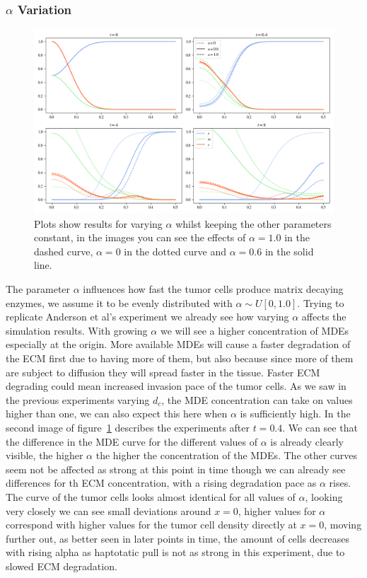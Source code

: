 \subsubsection*{$\alpha$ Variation}
\begin{figure}[h]
    \centering
    \includegraphics[width=\textwidth]{resources/images/alpha_variation.png}
    \caption{Plots show results for varying $\alpha$ whilst keeping the other parameters constant, in the images you can see the effects of $\alpha=1.0$ in the dashed curve, $\alpha=0$ in the dotted curve and $\alpha=0.6$ in the solid line.}
    \label{fig:alpha_variation}
\end{figure}
The parameter $\alpha$ influences how fast the tumor cells produce matrix decaying enzymes, we assume it to be evenly distributed with $\alpha \sim U[0, 1.0]$. Trying to replicate Anderson et al's experiment we already see how varying $\alpha$ affects the simulation results. With growing $\alpha$ we will see a higher concentration of MDEs especially at the origin. More available MDEs will cause a faster degradation of the ECM first due to having more of them, but also because since more of them are subject to diffusion they will spread faster in the tissue. Faster ECM degrading could mean increased invasion pace of the tumor cells. As we saw in the previous experiments varying $d_c$, the MDE concentration can take on values higher than one, we can also expect this here when $\alpha$ is sufficiently high. \newline 
In the second image of figure~\ref{fig:alpha_variation} describes the experiments after $t=0.4$. We can see that the difference in the MDE curve for the different values of $\alpha$ is already clearly visible, the higher $\alpha$ the higher the concentration of the MDEs. The other curves seem not be affected as strong at this point in time though we can already see differences for th ECM concentration, with a rising degradation pace as $\alpha$ rises. The curve of the tumor cells looks almost identical for all values of $\alpha$, looking very closely we can see small deviations around $x=0$, higher values for $\alpha$ correspond with higher values for the tumor cell density directly at $x=0$, moving further out, as better seen in later points in time, the amount of cells decreases with rising alpha as haptotatic pull is not as strong in this experiment, due to slowed ECM degradation. \newline 
